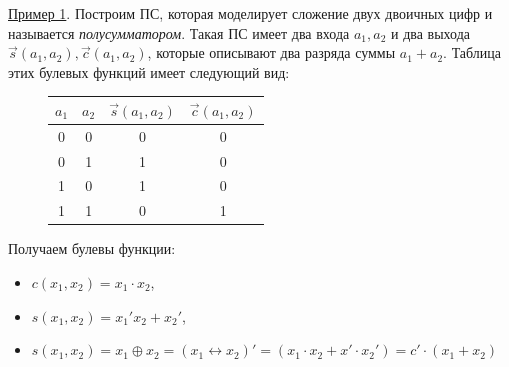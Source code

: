 \begin{figure}[H]
    \centering
\end{figure}

\underline{Пример 1}.
Построим ПС, которая моделирует сложение двух двоичных цифр и называется \textit{полусумматором}. Такая ПС имеет два входа $a_1,a_2$ и два выхода $\vec s(a_1, a_2), \vec c(a_1, a_2)$, которые описывают два разряда суммы $a_1 + a_2$. Таблица этих булевых функций имеет следующий вид:
\begin{figure}[H]
    \centering
    \begin{tabular}{|c|c|c|c|}
        \hline
        $a_1$ & $a_2$ & $\vec s(a_1, a_2)$ & $\vec c(a_1, a_2)$ \\
        \hline
        0     & 0     & 0                  & 0                  \\
        0     & 1     & 1                  & 0                  \\
        1     & 0     & 1                  & 0                  \\
        1     & 1     & 0                  & 1                  \\
        \hline
    \end{tabular}
\end{figure}

Получаем булевы функции:

\begin{itemize}
    \item $c(x_1, x_2) = x_1 \cdot x_2$,
    \item $s(x_1, x_2) = x_1' x_2 + x_2'$,
    \item $s(x_1, x_2) = x_1 \oplus x_2 = (x_1 \leftrightarrow x_2)' = (x_1 \cdot x_2 + x' \cdot x_2') = c' \cdot (x_1 + x_2)$
\end{itemize}

